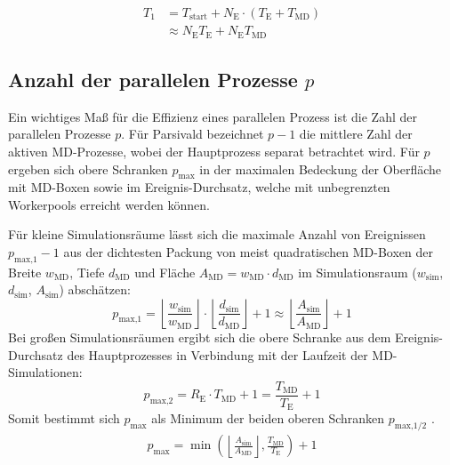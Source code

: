 \begin{align}
  T_1 & = T_\text{start} + N_\text{E} \cdot (T_\text{E} + T_\text{MD}) \\
      & \approx N_\text{E} T_\text{E} + N_\text{E} T_\text{MD}
\end{align}

\subsection{Anzahl der parallelen Prozesse $p$}

Ein wichtiges Maß für die Effizienz eines parallelen Prozess ist die Zahl der parallelen Prozesse $p$.
Für Parsivald bezeichnet $p-1$ die mittlere Zahl der aktiven MD-Prozesse, wobei der Hauptprozess separat betrachtet wird.
Für $p$ ergeben sich obere Schranken $p_\text{max}$ in der maximalen Bedeckung der Oberfläche mit MD-Boxen sowie im Ereignis-Durchsatz, welche mit unbegrenzten Workerpools erreicht werden können.

Für kleine Simulationsräume lässt sich die maximale Anzahl von Ereignissen $p_\text{max,1}-1$ aus der dichtesten Packung von meist quadratischen MD-Boxen der Breite $w_\text{MD}$, Tiefe $d_\text{MD}$ und Fläche $A_\text{MD} = w_\text{MD} \cdot d_\text{MD}$ im Simulationsraum ($w_\text{sim}$, $d_\text{sim}$, $A_\text{sim}$) abschätzen:
\begin{equation}
  p_\text{max,1} = \left\lfloor\frac{w_\text{sim}}{w_\text{MD}}\right\rfloor \cdot \left\lfloor\frac{d_\text{sim}}{d_\text{MD}}\right\rfloor + 1 \approx \left\lfloor\frac{A_\text{sim}}{A_\text{MD}}\right\rfloor + 1
  \label{eq:pmax1}
\end{equation}
Bei großen Simulationsräumen ergibt sich die obere Schranke aus dem Ereignis-Durchsatz des Hauptprozesses in Verbindung mit der Laufzeit der MD-Simulationen:
\begin{equation}
  p_\text{max,2} = R_\text{E} \cdot T_\text{MD} + 1 = \frac{T_\text{MD}}{T_\text{E}} + 1
  \label{eq:pmax2}
\end{equation}
Somit bestimmt sich $p_\text{max}$ als Minimum der beiden oberen Schranken $p_\text{max,1/2}$ .
\begin{align}
  p_\text{max} = \min\left(\left\lfloor\frac{A_\text{sim}}{A_\text{MD}}\right\rfloor, \frac{T_\text{MD}}{T_\text{E}}\right) + 1
  \label{eq:pmax}
\end{align}

